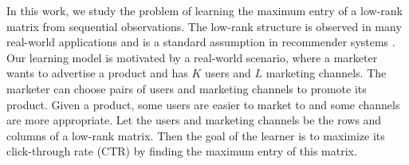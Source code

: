 In this work, we study the problem of learning the maximum entry of a low-rank matrix from sequential observations. The low-rank structure is observed in many real-world applications and is a standard assumption in recommender systems \citep{koren2009matrix,ricci2011liorrokach}. Our learning model is motivated by a real-world scenario, where a marketer wants to advertise a product and has $K$ users and $L$ marketing channels. The marketer can choose pairs of users and marketing channels to promote its product. Given a product, some users are easier to market to and some channels are more appropriate. Let the users and marketing channels be the rows and columns of a low-rank matrix. Then the goal of the learner is to maximize its click-through rate (CTR) by finding the maximum entry of this matrix. 






